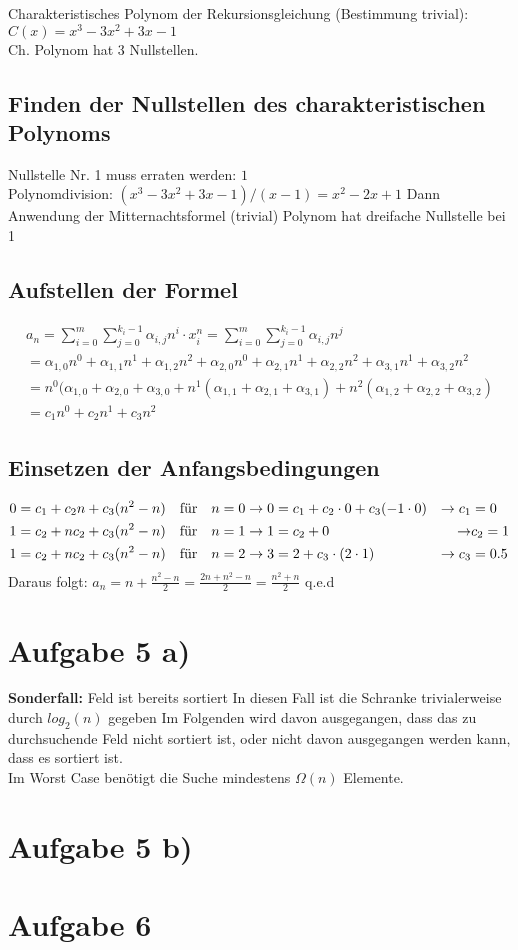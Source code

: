 \documentclass[a4paper,10pt,freqn]{article}
\begin{document}
Charakteristisches Polynom der Rekursionsgleichung (Bestimmung trivial):\\
$C(x) = x^3-3x^2+3x-1$\\
\textrightarrow Ch. Polynom hat 3 Nullstellen.
\subsection{Finden der Nullstellen des charakteristischen Polynoms}
Nullstelle Nr. 1 muss erraten werden: $1$\\
Polynomdivision: $(x^3-3x^2+3x-1)/(x-1)=x^2-2x+1$
Dann Anwendung der Mitternachtsformel (trivial) \textrightarrow Polynom hat dreifache Nullstelle bei 1
\subsection{Aufstellen der Formel}
\begin{eqnarray*}
 a_n = \sum_{i=0}^m\sum_{j=0}^{k_i-1} \alpha_{i,j}n^i
 \cdot x_i^n  =\sum_{i=0}^m\sum_{j=0}^{k_i-1} \alpha_{i,j}n^j\\
 =\alpha_{1,0}n^0+\alpha_{1,1}n^1+\alpha_{1,2}n^2+\alpha_{2,0}n^0+\alpha_{2,1}n^1+\alpha_{2,2}n^2+\alpha_{3,1}n^1+\alpha_{3,2}n^2\\=
 n^0(\alpha_{1,0}+\alpha_{2,0}+\alpha_{3,0}+n^1(\alpha_{1,1}+\alpha_{2,1}+\alpha_{3,1})+n^2(\alpha_{1,2}+\alpha_{2,2}+\alpha_{3,2})\\=
 c_1n^0+c_2n^1+c_3n^2
\end{eqnarray*}

\subsection{Einsetzen der Anfangsbedingungen}
\begin{align*}
 0&=c_1+c_2n+c_3(n^2-n) &\text{für\quad}& n = 0\rightarrow 0 = c_1+c_2\cdot0+c_3(-1\cdot0) &\rightarrow c_1& = 0\\
 1&=c_2+nc_2+c_3(n^2-n) &\text{für\quad}& n = 1\rightarrow 1 = c_2+0 &\rightarrow& c_2 = 1\\
 1&=c_2+nc_2+c_3(n^2-n) &\text{für\quad}& n = 2\rightarrow 3 = 2+c_3\cdot(2\cdot1) &\rightarrow c_3& = 0.5\\
\end{align*}
Daraus folgt: $a_n = n+\frac{n^2-n}{2}=\frac{2n+n^2-n}{2}=\frac{n^2+n}{2}$ q.e.d

\section{Aufgabe 5 a)}
\textbf{Sonderfall:} Feld ist bereits sortiert \textrightarrow In diesen Fall ist die Schranke trivialerweise durch $log_2(n)$ gegeben
\newline
Im Folgenden wird davon ausgegangen, dass das zu durchsuchende Feld nicht sortiert ist, oder nicht davon ausgegangen werden kann, dass es sortiert ist.\\
Im Worst Case benötigt die Suche mindestens $\Omega(n)$ Elemente.

\section{Aufgabe 5 b)}

\section{Aufgabe 6}
\end{document}
